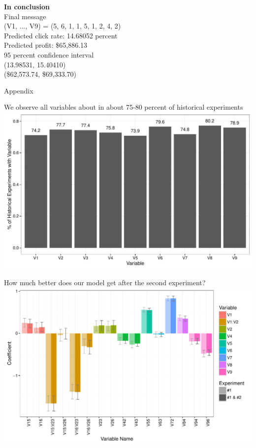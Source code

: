 \documentclass[11pt,xcolor=svgnames]{beamer}
\newcommand{\fg}{\color{ForestGreen}}
\newcommand{\nv}{\color{Navy}}
\begin{document}
\begin{frame}
\textbf{\Large \nv In conclusion}\\
\vspace{0.2in}
Final message\\
(V1, ..., V9) = (5, 6, 1, 1, 5, 1, 2, 4, 2)\\
\vspace{0.15in}
Predicted click rate: 14.68052 percent\\
{\fg Predicted profit: \$65,886.13}\\
\vspace{0.15in}
95 percent confidence interval\\
(13.98531, 15.40410)\\
{\fg (\$62,573.74, \$69,333.70)}
\end{frame}

\begin{frame}[c]{ }
\centering
Appendix
\end{frame}

\begin{frame}
We observe all variables about in about 75-80 percent of historical experiments
\includegraphics[width=\textwidth]{hist_freq.pdf}
\end{frame}

\begin{frame}
How much better does our model get after the second experiment?
\includegraphics[width=\textwidth]{final_model_coefs_crazy.pdf}
\end{frame}
\end{document}
